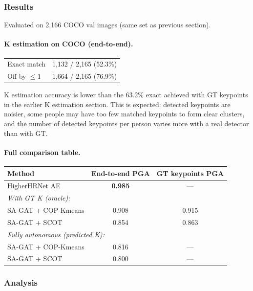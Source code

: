 \subsubsection{Results}

Evaluated on 2,166 COCO val images (same set as previous section).

\paragraph{K estimation on COCO (end-to-end).}

\begin{tabular}{ll}
\hline
Exact match & 1,132 / 2,165 (52.3\%) \\
Off by $\leq 1$ & 1,664 / 2,165 (76.9\%) \\
\hline
\end{tabular}

\vspace{0.5em}

K estimation accuracy is lower than the 63.2\% exact achieved with GT keypoints in the earlier K estimation section. This is expected: detected keypoints are noisier, some people may have too few matched keypoints to form clear clusters, and the number of detected keypoints per person varies more with a real detector than with GT.

\paragraph{Full comparison table.}

\begin{tabular}{lcc}
\hline
\textbf{Method} & \textbf{End-to-end PGA} & \textbf{GT keypoints PGA} \\
\hline
HigherHRNet AE & \textbf{0.985} & --- \\
\hline
\multicolumn{3}{l}{\emph{With GT K (oracle):}} \\
SA-GAT + COP-Kmeans & 0.908 & 0.915 \\
SA-GAT + SCOT & 0.854 & 0.863 \\
\hline
\multicolumn{3}{l}{\emph{Fully autonomous (predicted K):}} \\
SA-GAT + COP-Kmeans & 0.816 & --- \\
SA-GAT + SCOT & 0.800 & --- \\
\hline
\end{tabular}

\subsubsection{Analysis}


